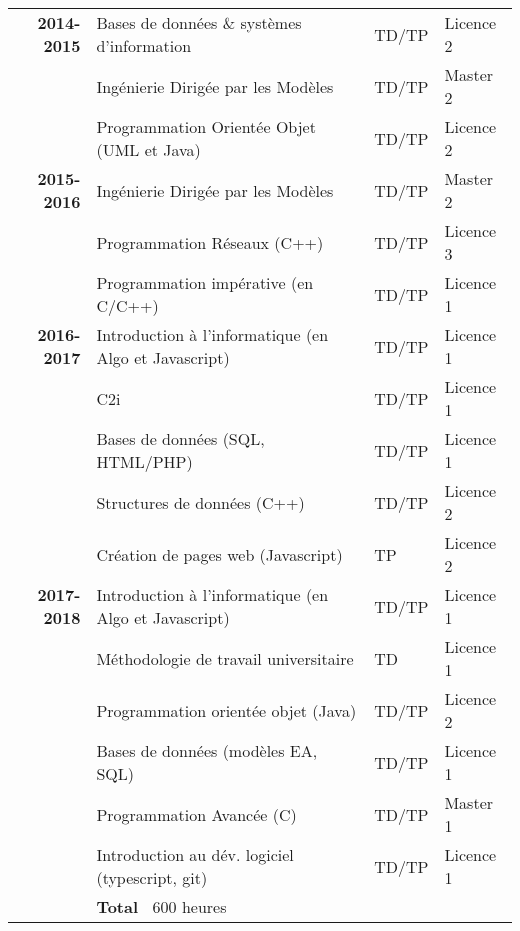 
\begin{tabular}{r @{~$\rangle$~} p{} l l}

\textbf{2014-2015} & Bases de données $\&$ systèmes d'information & TD/TP & Licence 2 \\
                   & Ingénierie Dirigée par les Modèles & TD/TP & Master 2 \\
                   & Programmation Orientée Objet (UML et Java) & TD/TP & Licence 2 \vspace{3mm}
 \\

\textbf{2015-2016} & Ingénierie Dirigée par les Modèles & TD/TP & Master 2 \\
                   & Programmation Réseaux (C++) & TD/TP & Licence 3 \\
                   & Programmation impérative (en C/C++) & TD/TP & Licence 1 \vspace{3mm} \\

\textbf{2016-2017} & Introduction à l'informatique (en Algo et Javascript) & TD/TP & Licence 1 \\
                   & C2i & TD/TP & Licence 1 \\
                   & Bases de données (SQL, HTML/PHP) & TD/TP & Licence 1 \\
                   & Structures de données (C++) & TD/TP & Licence 2 \\
                   & Création de pages web (Javascript) & TP & Licence 2  \vspace{3mm}\\
                   
\textbf{2017-2018} & Introduction à l'informatique (en Algo et Javascript) & TD/TP & Licence 1 \\
			 & Méthodologie de travail universitaire & TD & Licence 1 \\
			 & Programmation orientée objet (Java) & TD/TP & Licence 2 \\
			 & Bases de données (modèles EA, SQL) & TD/TP & Licence 1 \\
                   & Programmation Avancée (C) & TD/TP & Master 1 \\
                   & Introduction au dév. logiciel (typescript, git) & TD/TP & Licence 1 \\

                   & {\bf Total~} $600$ heures & \\
\end{tabular}